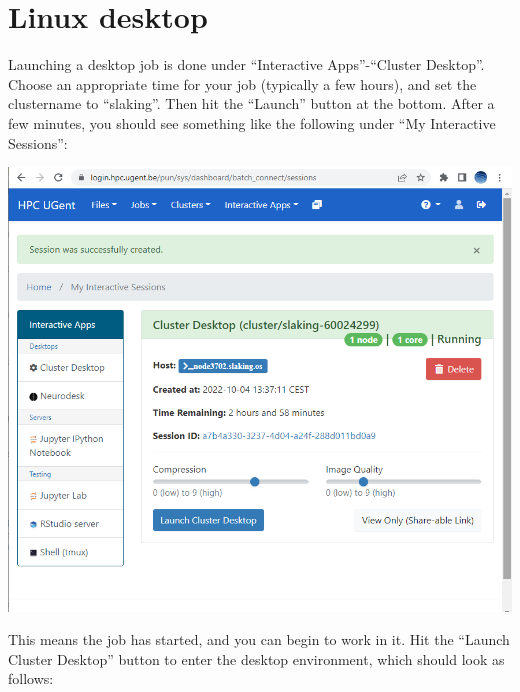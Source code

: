 \documentclass[a4paper]{article}
\begin{document}
\section{Linux desktop}
%
\par
Launching a desktop job is done under ``Interactive Apps''-``Cluster Desktop''. Choose an appropriate time for your job (typically a few hours), and set the clustername to ``slaking''. Then hit the ``Launch'' button at the bottom. After a few minutes, you should see something like the following under ``My Interactive Sessions'':
%
\begin{center}
	\includegraphics[scale=.4]{launch_desktop}
\end{center}
%
This means the job has started, and you can begin to work in it. Hit the ``Launch Cluster Desktop'' button to enter the desktop environment, which should look as follows:
%
\end{document}
